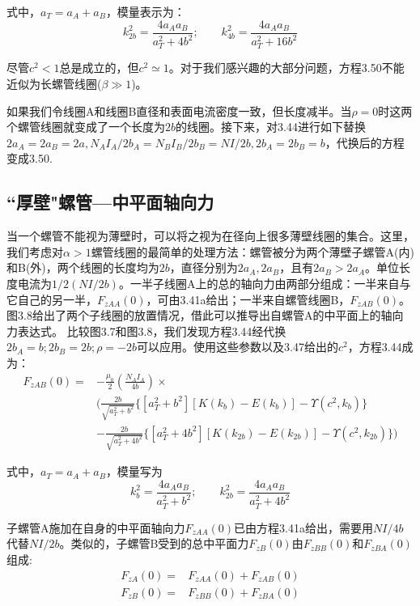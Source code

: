 式中，$a_T=a_A+a_B$，模量表示为：
$$k_{2b}^2=\frac{4a_A a_B}{a_T^2+4b^2} ; \qquad k_{4b}^2=\frac{4a_A a_B}{a_T^2+16b^2} $$

尽管$c^2<1$总是成立的，但$c^2\simeq 1$。对于我们感兴趣的大部分问题，方程3.50不能近似为长螺管线圈($\beta\gg 1$)。

如果我们令线圈A和线圈B直径和表面电流密度一致，但长度减半。当$\rho=0$时这两个螺管线圈就变成了一个长度为$2b$的线圈。接下来，对3.44进行如下替换$2a_A=2a_B=
2a, N_A I_A/2b_A = N_B I_B/2b_B = NI/2b,2b_A = 2b_B = b$，代换后的方程变成3.50.

\subsection{``厚壁"螺管---中平面轴向力}
当一个螺管不能视为薄壁时，可以将之视为在径向上很多薄壁线圈的集合。这里，我们考虑对$\alpha>1$螺管线圈的最简单的处理方法：螺管被分为两个薄壁子螺管A(内)和B(外)，两个线圈的长度均为$2b$，直径分别为$2a_A,2a_B$，且有$2a_B >2a_A$。单位长度电流为$1/2(NI/2b)$。一半子线圈A上的总的轴向力由两部分组成：一半来自与它自己的另一半，$F_{zAA}(0)$，可由3.41a给出；一半来自螺管线圈B，$F_{zAB}(0)$。图3.8给出了两个子线圈的放置情况，借此可以推导出自螺管A的中平面上的轴向力表达式。
比较图3.7和图3.8，我们发现方程3.44经代换$2b_A = b; 2b_B = 2b; \rho = −2b$可以应用。使用这些参数以及3.47给出的$c^2$，方程3.44成为：
\begin{equation}
\begin{split}
F_{zAB}(0)=&-\frac{\mu_0}{2}(\frac{N_A I_A}{4b})\times \\
&\bigg(\frac{2b}{\sqrt{a_T^2+b^2}} \{[a_T^2+b^2][K(k_{b})-E(k_{b})]-\Upsilon(c^2,k_b)\}\\
&-\frac{2b}{\sqrt{a_T^2+4b^2}} \{[a_T^2+4b^2][K(k_{2b})-E(k_{2b})]-\Upsilon(c^2,k_{2b}) \}\bigg)
\end{split}
\end{equation}

式中，$a_T=a_A+a_B$，模量写为
$$k_{b}^2=\frac{4a_A a_B}{a_T^2+b^2} ;\qquad k_{2b}^2=\frac{4a_A a_B}{a_T^2+4b^2} $$

子螺管A施加在自身的中平面轴向力$F_{zAA}(0)$已由方程3.41a给出，需要用$NI/4b$代替$NI/2b$。类似的，子螺管B受到的总中平面力$F_{zB}(0)$由$F_{zBB}(0)$和$F_{zBA}(0)$组成:
\begin{subequations}
	\begin{align}
F_{zA}(0) =& F_{zAA}(0)+F_{zAB}(0) \\
F_{zB}(0) =& F_{zBB}(0)+F_{zBA}(0)
	\end{align}
\end{subequations}

